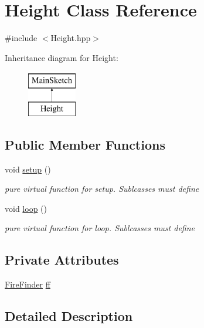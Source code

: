 \hypertarget{classHeight}{\section{Height Class Reference}
\label{classHeight}
}


{\ttfamily \#include $<$Height.\-hpp$>$}

Inheritance diagram for Height\-:\begin{figure}[H]
\begin{center}
\leavevmode
\includegraphics[height=2.000000cm]{classHeight}
\end{center}
\end{figure}
\subsection*{Public Member Functions}
\begin{DoxyCompactItemize}
\item 
void \hyperlink{classHeight_a62695cd45bcf1f441a73959774ef1151}{setup} ()
\begin{DoxyCompactList}\small\item\em pure virtual function for setup. Sublcasses must define \end{DoxyCompactList}\item 
void \hyperlink{classHeight_aa39bf5774d0ddf8e853d600dc70fd443}{loop} ()
\begin{DoxyCompactList}\small\item\em pure virtual function for loop. Sublcasses must define \end{DoxyCompactList}\end{DoxyCompactItemize}
\subsection*{Private Attributes}
\begin{DoxyCompactItemize}
\item 
\hyperlink{classFireFinder}{Fire\-Finder} \hyperlink{classHeight_a9cb83b4ed7622c3961552cf8f383d1b0}{ff}
\end{DoxyCompactItemize}


\subsection{Detailed Description}


